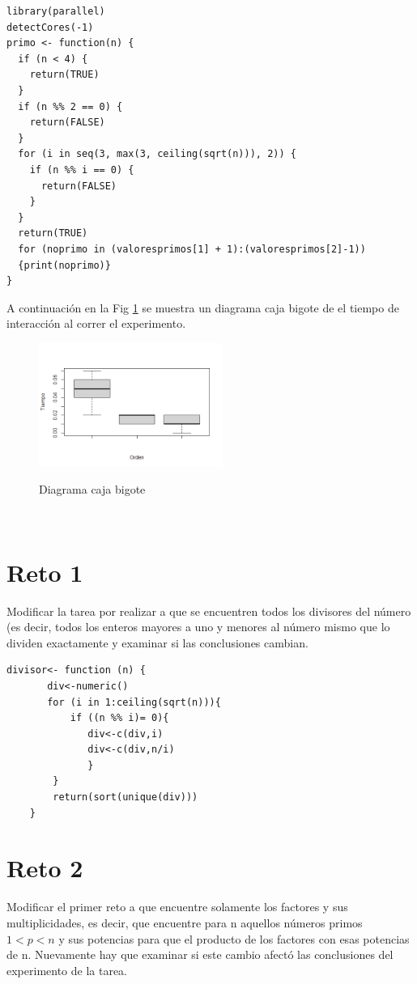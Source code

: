 \documentclass[a4paper]{article}
\begin{document}
\begin{lstlisting}
library(parallel)
detectCores(-1)
primo <- function(n) {
  if (n < 4) {
    return(TRUE)
  }
  if (n %% 2 == 0) {
    return(FALSE)
  }
  for (i in seq(3, max(3, ceiling(sqrt(n))), 2)) {
    if (n %% i == 0) {
      return(FALSE)
    }
  }
  return(TRUE)
  for (noprimo in (valoresprimos[1] + 1):(valoresprimos[2]-1))
  {print(noprimo)}
}
\end{lstlisting}
\justify A continuación en la Fig \ref{practica3.png} se muestra un diagrama caja bigote de el tiempo de interacción al correr el experimento. 
\begin{figure}[h]
    \centering
     \includegraphics[width=60mm]{practica3.png}
    \caption\\Diagrama caja bigote{\label{practica3.png}
    \label{practica3.png}}
\end{figure}
 
\section{Reto 1}
 Modificar la tarea por realizar a que se encuentren todos los divisores del número (es decir, todos los enteros mayores a uno y menores al número mismo que lo dividen exactamente y examinar si las conclusiones cambian.
 
\begin{lstlisting}
divisor<- function (n) {
       div<-numeric()
       for (i in 1:ceiling(sqrt(n))){
           if ((n %% i)= 0){
              div<-c(div,i)
              div<-c(div,n/i)
              }
        }
        return(sort(unique(div)))
    }
\end{lstlisting}

 \section{Reto 2}
 Modificar el primer reto a que encuentre solamente los factores y sus multiplicidades, es decir, que encuentre para n aquellos números primos $1 < p < n$ y sus potencias para que el producto de los factores con esas potencias de n. Nuevamente hay que examinar si este cambio afectó las conclusiones del experimento de la tarea.
 
\end{document}
